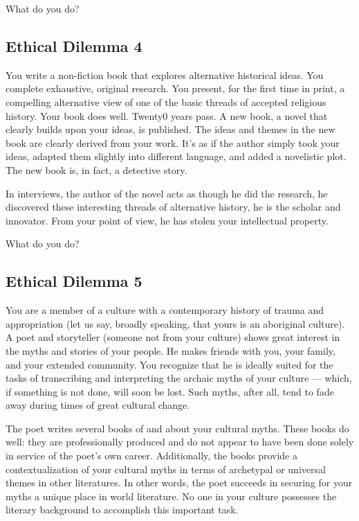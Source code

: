 \documentclass[letterpaper,oneside]{memoir}
\begin{document}
\begin{description}
What do you do?

\subsection{Ethical Dilemma 4}
You write a non-fiction book that explores alternative historical ideas. You complete exhaustive, original research. You present, for the first time in print, a compelling alternative view of one of the basic threads of accepted religious history. Your book does well.
Twenty0 years pass. A new book, a novel that clearly builds upon your ideas, is published. The ideas and themes in the new book are clearly derived from your work. It's as if the author simply took your ideas, adapted them slightly into different language, and added a novelistic plot. The new book is, in fact, a detective story.

In interviews, the author of the novel acts as though he did the research, he discovered these interesting threads of alternative history, he is the scholar and innovator. From your point of view, he has stolen your intellectual property.

What do you do?

\subsection{Ethical Dilemma 5}
You are a member of a culture with a contemporary history of trauma and appropriation (let us say, broadly speaking, that yours is an aboriginal culture). A poet and storyteller (someone not from your culture) shows great interest in the myths and stories of your people. He makes friends with you, your family, and your extended community. You recognize that he is ideally suited for the tasks of transcribing and interpreting the archaic myths of your culture --- which, if something is not done, will soon be lost. Such myths, after all, tend to fade away during times of great cultural change.

The poet writes several books of and about your cultural myths. These books do well: they are professionally produced and do not appear to have been done solely in service of the poet's own career.
Additionally, the books provide a contextualization of your cultural myths in terms of archetypal or universal themes in other literatures. In other words, the poet succeeds in securing for your myths a unique place in world literature. No one in your culture possesses the literary background to accomplish this important task.


\end{description}
\end{document}
